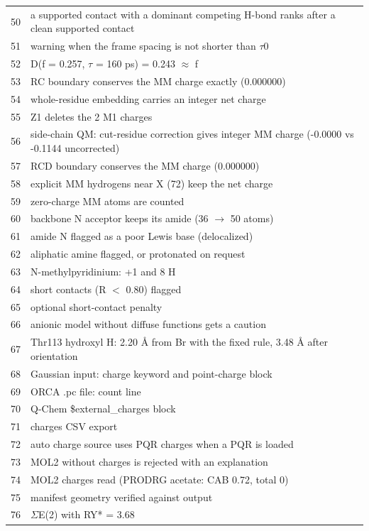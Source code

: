 {\begin{longtable}{rp{14.5cm}}
50 & a supported contact with a dominant competing H-bond ranks after a clean supported contact\\
51 & warning when the frame spacing is not shorter than $\tau$0\\
52 & D(f = 0.257, $\tau$ = 160 ps) = 0.243 $\approx$ f\\
53 & RC boundary conserves the MM charge exactly (0.000000)\\
54 & whole-residue embedding carries an integer net charge\\
55 & Z1 deletes the 2 M1 charges\\
56 & side-chain QM: cut-residue correction gives integer MM charge (-0.0000 vs -0.1144 uncorrected)\\
57 & RCD boundary conserves the MM charge (0.000000)\\
58 & explicit MM hydrogens near X (72) keep the net charge\\
59 & zero-charge MM atoms are counted\\
60 & backbone N acceptor keeps its amide (36 $\to$ 50 atoms)\\
61 & amide N flagged as a poor Lewis base (delocalized)\\
62 & aliphatic amine flagged, or protonated on request\\
63 & N-methylpyridinium: +1 and 8 H\\
64 & short contacts (R $<$ 0.80) flagged\\
65 & optional short-contact penalty\\
66 & anionic model without diffuse functions gets a caution\\
67 & Thr113 hydroxyl H: 2.20 \AA{} from Br with the fixed rule, 3.48 \AA{} after orientation\\
68 & Gaussian input: charge keyword and point-charge block\\
69 & ORCA .pc file: count line\\
70 & Q-Chem \$external\_charges block\\
71 & charges CSV export\\
72 & auto charge source uses PQR charges when a PQR is loaded\\
73 & MOL2 without charges is rejected with an explanation\\
74 & MOL2 charges read (PRODRG acetate: CAB 0.72, total 0)\\
75 & manifest geometry verified against output\\
76 & $\Sigma$E(2) with RY* = 3.68\\

\end{longtable}}
